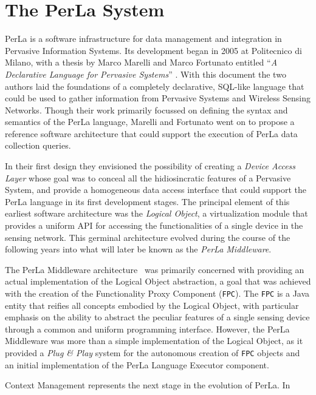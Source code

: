 \chapter{The PerLa System}

PerLa is a software infrastructure for data management and integration in
Pervasive Information Systems. Its development began in 2005 at Politecnico di
Milano, with a thesis by Marco Marelli and Marco Fortunato entitled ``\textit{A
Declarative Language for Pervasive Systems}'' \cite{mm_thesis}. With this
document the two authors laid the foundations of a completely declarative,
SQL-like language that could be used to gather information from Pervasive
Systems and Wireless Sensing Networks. Though their work primarily focussed on
defining the syntax and semantics of the PerLa language, Marelli and Fortunato
went on to propose a reference software architecture that could support the
execution of PerLa data collection queries.

In their first design they envisioned the possibility of creating a
\textit{Device Access Layer} whose goal was to conceal all the hidiosincratic
features of a Pervasive System, and provide a homogeneous data access interface
that could support the PerLa language in its first development stages. The
principal element of this earliest software architecture was the
\textit{Logical Object}, a virtualization module that provides a uniform API
for accessing the functionalities of a single device in the sensing network.
This germinal architecture evolved during the course of the following years
into what will later be known as the \textit{PerLa Middleware}. 

The PerLa Middleware architecture~\cite{tse_perla} was primarily concerned with
providing an actual implementation of the Logical Object abstraction, a goal
that was achieved with the creation of the Functionality Proxy Component
(\texttt{FPC}). The \texttt{FPC} is a Java entity that reifies all concepts
embodied by the Logical Object, with particular emphasis on the ability to
abstract the peculiar features of a single sensing device through a common and
uniform programming interface. However, the PerLa Middleware was more than a
simple implementation of the Logical Object, as it provided a \textit{Plug \&
Play} system for the autonomous creation of \texttt{FPC} objects and an
initial implementation of the PerLa Language Executor component.

Context Management represents the next stage in the evolution of PerLa. In
\cite{push_ctx} 

